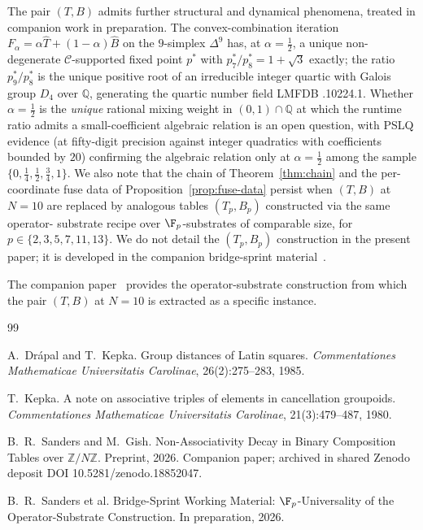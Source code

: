 \documentclass[11pt,reqno]{amsart}
\theoremstyle{plain}
\theoremstyle{definition}
\theoremstyle{remark}
\newcommand{\Q}{\mathbb{Q}}
\newcommand{\Cfour}{\mathcal{C}}
\begin{document}
The pair $(T, B)$ admits further structural and dynamical
phenomena, treated in companion work in preparation. The
convex-combination iteration $F_{\alpha} = \alpha \widehat{T} +
(1-\alpha)\widehat{B}$ on the $9$-simplex $\Delta^{9}$ has, at
$\alpha = \tfrac{1}{2}$, a unique non-degenerate
$\Cfour$-supported fixed point $p^{*}$ with $p^{*}_{7}/p^{*}_{8}
= 1+\sqrt{3}$ exactly; the ratio $p^{*}_{9}/p^{*}_{8}$ is the
unique positive root of an irreducible integer quartic with
Galois group $D_{4}$ over $\Q$, generating the quartic number
field LMFDB .10224.1. Whether $\alpha =
\tfrac{1}{2}$ is the \emph{unique} rational mixing weight in
$(0,1)\cap\Q$ at which the runtime ratio admits a
small-coefficient algebraic relation is an open question, with
PSLQ evidence (at fifty-digit precision against integer
quadratics with coefficients bounded by $20$) confirming the
algebraic relation only at $\alpha = \tfrac{1}{2}$ among the
sample $\{0, \tfrac{1}{4}, \tfrac{1}{2}, \tfrac{3}{4}, 1\}$. We
also note that the chain of Theorem~\ref{thm:chain} and the
per-coordinate fuse data of Proposition~\ref{prop:fuse-data}
persist when $(T, B)$ at $N = 10$ are replaced by analogous
tables $(T_{p}, B_{p})$ constructed via the same operator-
substrate recipe over $\F_{p}$-substrates of comparable size,
for $p \in \{2, 3, 5, 7, 11, 13\}$. We do not detail the
$(T_{p}, B_{p})$ construction in the present paper; it is
developed in the companion bridge-sprint
material~\cite{SandersClaudeChat2026BridgeSprint}.

The companion paper~\cite{SandersGish2026Sigma} provides the
operator-substrate construction from which the pair $(T, B)$ at
$N = 10$ is extracted as a specific instance.

\begin{thebibliography}{99}

A.~Dr\'{a}pal and T.~Kepka.
\newblock Group distances of Latin squares.
\newblock \emph{Commentationes Mathematicae Universitatis Carolinae},
26(2):275--283, 1985.

T.~Kepka.
\newblock A note on associative triples of elements in cancellation groupoids.
\newblock \emph{Commentationes Mathematicae Universitatis Carolinae},
21(3):479--487, 1980.

B.~R.~Sanders and M.~Gish.
\newblock Non-Associativity Decay in Binary Composition Tables over
$\mathbb{Z}/N\mathbb{Z}$.
\newblock Preprint, 2026.
\newblock Companion paper; archived in shared Zenodo deposit DOI
10.5281/zenodo.18852047.

B.~R.~Sanders et al.
\newblock Bridge-Sprint Working Material: $\F_{p}$-Universality of the
Operator-Substrate Construction.
\newblock In preparation, 2026.

\end{thebibliography}
\end{document}
